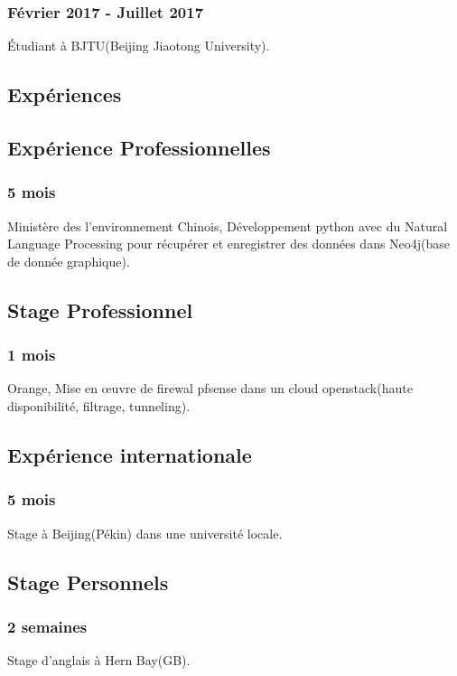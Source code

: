 \documentclass{article}
\begin{document}
        \subsubsection{F\'evrier 2017 - Juillet 2017}
            \'Etudiant \`a BJTU(Beijing Jiaotong University).

    \vspace{1cm}

    \begin{multicols}{2}
        \section{Exp\'eriences}
            \subsection{Exp\'erience Professionnelles}
                \subsubsection{5 mois}
                    Minist\`ere des l'environnement Chinois, D\'eveloppement python avec du Natural Language Processing pour r\'ecup\'erer et enregistrer des donn\'ees dans Neo4j(base de donnée graphique).
            \subsection{Stage Professionnel}
                \subsubsection{1 mois}
                    Orange, Mise en \oe{}uvre de firewal pfsense dans un cloud openstack(haute disponibilit\'e, filtrage, tunneling).
            \subsection{Exp\'erience internationale}
                \subsubsection{5 mois}
                    Stage \`a Beijing(P\'ekin) dans une universit\'e locale.
            \subsection{Stage Personnels}
                \subsubsection{2 semaines}
                    Stage d'anglais \`a Hern Bay(GB).

\end{multicols}
\end{document}

